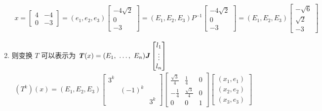 \begin{solution}
\begin{enumerate}
                        \begin{align*}
                            x = \begin{bmatrix}
                                4 & -4 \\ 0 & -3
                            \end{bmatrix} = (e_1, e_2, e_3)\begin{bmatrix}
                                -4\sqrt{2} \\ 0 \\ -3
                            \end{bmatrix} = (E_1, E_2, E_3)P^{-1}\begin{bmatrix}
                                -4\sqrt{2} \\ 0 \\ -3
                            \end{bmatrix} = (E_1, E_2, E_3)\begin{bmatrix}
                                -\sqrt{6} \\ \sqrt{2} \\ -3
                            \end{bmatrix}
                        \end{align*}
                    \item 则变换 $T$ 可以表示为 $\textbf{\textit{T}}(x) = (E_1, \ \dots, \ E_n)\textbf{\textit{J}}\begin{bmatrix} l_1 \\ \vdots \\ l_n \end{bmatrix}$
                        \begin{align*}
                            (T^k)(x) = (E_1, E_2, E_3)\begin{bmatrix}
                                3^k & & \\ & (-1)^k & \\ & & 3^k
                            \end{bmatrix}\begin{bmatrix}
                                \frac{\sqrt{3}}{4} & \frac{1}{4} & 0 \\ -\frac{1}{4} & \frac{\sqrt{3}}{4} & 0 \\ 0 & 0 & 1
                            \end{bmatrix}\begin{bmatrix}
                                (x_1,e_1) \\ (x_2,e_2) \\ (x_3,e_3)
                            \end{bmatrix}
                        \end{align*}
                \end{enumerate}
            \end{solution}

